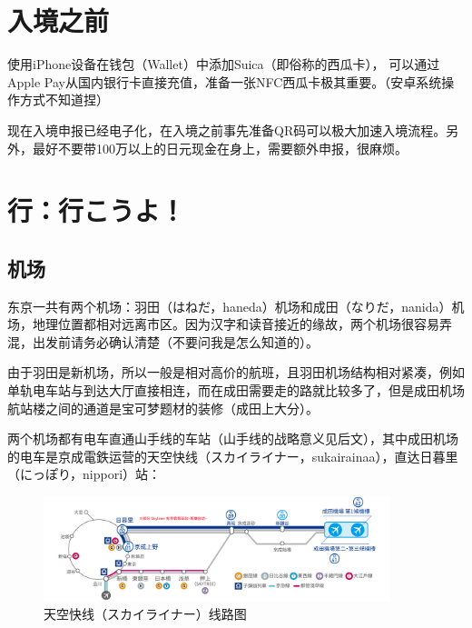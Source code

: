 \documentclass{article}
\begin{document}
\tableofcontents %
\newpage

\section{入境之前}
使用iPhone设备在钱包（Wallet）中添加Suica（即俗称的西瓜卡）， 可以通过Apple Pay从国内银行卡直接充值，准备一张NFC西瓜卡极其重要。（安卓系统操作方式不知道捏）\par
现在入境申报已经电子化，在入境之前事先准备QR码可以极大加速入境流程。另外，最好不要带100万以上的日元现金在身上，需要额外申报，很麻烦。\par
\section{行：行こうよ！}
\subsection{机场}
东京一共有两个机场：羽田（はねだ，haneda）机场和成田（なりだ，nanida）机场，地理位置都相对远离市区。因为汉字和读音接近的缘故，两个机场很容易弄混，出发前请务必确认清楚（不要问我是怎么知道的）。\par
由于羽田是新机场，所以一般是相对高价的航班，且羽田机场结构相对紧凑，例如单轨电车站与到达大厅直接相连，而在成田需要走的路就比较多了，但是成田机场航站楼之间的通道是宝可梦题材的装修（成田上大分）。\par
两个机场都有电车直通山手线的车站（山手线的战略意义见后文），其中成田机场的电车是京成電鉄运营的天空快线（スカイライナー，sukairainaa），直达日暮里（にっぽり，nippori）站：
\begin{figure}[h!]
    \centering
    \includegraphics[width=0.9\textwidth]{./fig/routemap_skyliner.jpg} %
    \caption{天空快线（スカイライナー）线路图\protect\footnotemark}
\end{figure}
\end{document}
